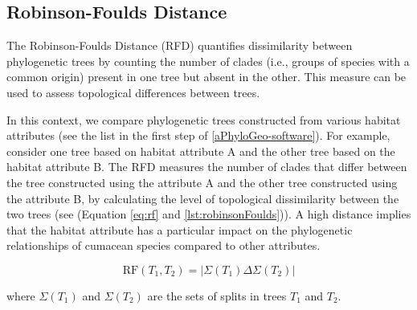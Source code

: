 \subsection{Robinson-Foulds Distance}\label{RF}

The Robinson-Foulds Distance (RFD) quantifies dissimilarity between phylogenetic trees by counting the number of clades (i.e., groups of species with a common origin) present in one tree but absent in the other. This measure can be used to assess topological differences between trees. 

In this context, we compare phylogenetic trees constructed from various habitat attributes (see the list in the first step of \autoref{aPhyloGeo-software}). For example, consider one tree based on habitat attribute A and the other tree based on the habitat attribute B. The RFD measures the number of clades that differ between the tree constructed using the attribute A and the other tree constructed using the attribute B, by calculating the level of topological dissimilarity between the two trees (see (Equation \eqref{eq:rf} and \autoref{lst:robinsonFoulds})). A high distance implies that the habitat attribute has a particular impact on the phylogenetic relationships of cumacean species compared to other attributes.

\begin{equation}\label{eq:rf}
    \text{RF}(T_1, T_2) = | \Sigma(T_1) \Delta \Sigma(T_2) |
\end{equation}

where $\Sigma(T_1)$ and $\Sigma(T_2)$ are the sets of splits in trees $T_1$ and $T_2$.

